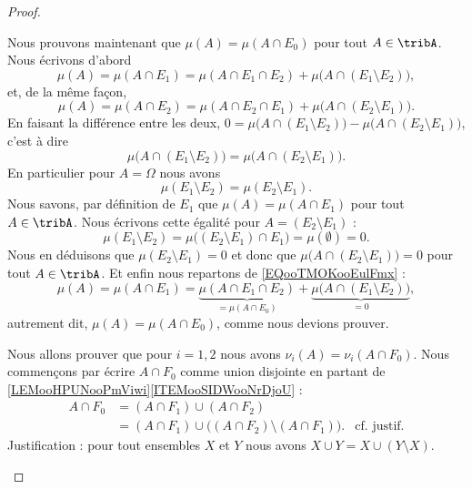 \begin{proof}
\begin{subproof}
				 \spitem[\( \mu(A)=\mu(A\cap E_0)\)]
				 Nous prouvons maintenant que \( \mu(A)=\mu(A\cap E_0)\) pour tout \( A\in\tribA\). Nous écrivons d'abord
				 \begin{equation}	\label{EQooTMOKooEulFmx}
				 \mu(A)=\mu(A\cap E_1)=\mu(A\cap E_1\cap E_2)+\mu\big( A\cap(E_1\setminus E_2) \big),
				 \end{equation}
				 et, de la même façon,
				 \begin{equation}
				 \mu(A)=\mu(A\cap E_2)=\mu(A\cap E_2\cap E_1)+\mu\big( A\cap(E_2\setminus E_1) \big).
				 \end{equation}
				 En faisant la différence entre les deux, \( 0=\mu\big( A\cap(E_1\setminus E_2) \big)-\mu\big( A\cap(E_2\setminus E_1) \big)\), c'est à dire
				 \begin{equation}
				 \mu\big( A\cap(E_1\setminus E_2) \big)=\mu\big( A\cap(E_2\setminus E_1) \big).
				 \end{equation}
				 En particulier pour \( A=\Omega\) nous avons
				 \begin{equation}
				 \mu(E_1\setminus E_2)=\mu(E_2\setminus E_1).
				 \end{equation}
				 Nous savons, par définition de \( E_1\) que \( \mu(A)=\mu(A\cap E_1)\) pour tout \( A\in\tribA\). Nous écrivons cette égalité pour \( A=(E_2\setminus E_1)\) :
					 \begin{equation}
					 \mu(E_1\setminus E_2)=\mu\big( (E_2\setminus E_1)\cap E_1 \big)=\mu(\emptyset)=0.
					 \end{equation}
					 Nous en déduisons que \( \mu(E_2\setminus E_1)=0\) et donc que \( \mu\big( A\cap(E_2\setminus E_1) \big)=0\) pour tout \( A\in\tribA\). Et enfin nous repartons de \eqref{EQooTMOKooEulFmx} :
					 \begin{equation}
					 \mu(A)=\mu(A\cap E_1)=\underbrace{\mu(A\cap E_1\cap E_2)}_{=\mu(A\cap E_0)}+\underbrace{\mu\big( A\cap(E_1\setminus E_2) \big)}_{=0},
					 \end{equation}
					 autrement dit, \( \mu(A)=\mu(A\cap E_0)\), comme nous devions prouver.

					 \spitem[\( \nu_i(A)=\nu_i(A\cap F_0)\)]
					 Nous allons prouver que pour \( i=1,2\) nous avons \( \nu_i(A)=\nu_i(A\cap F_0)\). Nous commençons par écrire \( A\cap F_0\) comme union disjointe en partant de \ref{LEMooHPUNooPmViwi}\ref{ITEMooSIDWooNrDjoU} :
					 \begin{subequations}
					 \begin{align}
					 A\cap F_0 & =(A\cap F_1)\cup (A\cap F_2)                                                       \\
												& =(A\cap F_1)\cup\big( (A\cap F_2)\setminus (A\cap F_1) \big). & \text{cf. justif.}
												\end{align}
												\end{subequations}
Justification : pour tout ensembles \( X\) et \( Y\) nous avons \( X\cup Y=X\cup(Y\setminus X)\).


\end{subproof}
\end{proof}
